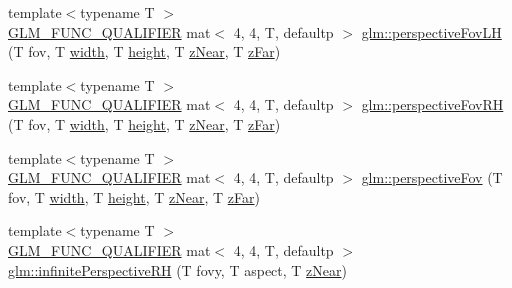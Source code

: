 \begin{DoxyCompactItemize}
\item 
{\footnotesize template$<$typename T $>$ }\\\mbox{\hyperlink{setup_8hpp_a33fdea6f91c5f834105f7415e2a64407}{G\+L\+M\+\_\+\+F\+U\+N\+C\+\_\+\+Q\+U\+A\+L\+I\+F\+I\+ER}} mat$<$ 4, 4, T, defaultp $>$ \mbox{\hyperlink{group__gtc__matrix__transform_ga6aebe16c164bd8e52554cbe0304ef4aa}{glm\+::perspective\+Fov\+LH}} (T fov, T \mbox{\hyperlink{_s_d_l__opengl_8h_a9a82cf3caff84cabc4598e2619faac17}{width}}, T \mbox{\hyperlink{_s_d_l__opengl_8h_aa352f2804b9902ac30769c00dde75d5f}{height}}, T \mbox{\hyperlink{_s_d_l__opengl__glext_8h_a12d99226e590bbaaf0be69169eeb4834}{z\+Near}}, T \mbox{\hyperlink{_s_d_l__opengl__glext_8h_a1052a8235df129542aea6da80fbec6a1}{z\+Far}})
\item 
{\footnotesize template$<$typename T $>$ }\\\mbox{\hyperlink{setup_8hpp_a33fdea6f91c5f834105f7415e2a64407}{G\+L\+M\+\_\+\+F\+U\+N\+C\+\_\+\+Q\+U\+A\+L\+I\+F\+I\+ER}} mat$<$ 4, 4, T, defaultp $>$ \mbox{\hyperlink{group__gtc__matrix__transform_gaf32bf563f28379c68554a44ee60c6a85}{glm\+::perspective\+Fov\+RH}} (T fov, T \mbox{\hyperlink{_s_d_l__opengl_8h_a9a82cf3caff84cabc4598e2619faac17}{width}}, T \mbox{\hyperlink{_s_d_l__opengl_8h_aa352f2804b9902ac30769c00dde75d5f}{height}}, T \mbox{\hyperlink{_s_d_l__opengl__glext_8h_a12d99226e590bbaaf0be69169eeb4834}{z\+Near}}, T \mbox{\hyperlink{_s_d_l__opengl__glext_8h_a1052a8235df129542aea6da80fbec6a1}{z\+Far}})
\item 
{\footnotesize template$<$typename T $>$ }\\\mbox{\hyperlink{setup_8hpp_a33fdea6f91c5f834105f7415e2a64407}{G\+L\+M\+\_\+\+F\+U\+N\+C\+\_\+\+Q\+U\+A\+L\+I\+F\+I\+ER}} mat$<$ 4, 4, T, defaultp $>$ \mbox{\hyperlink{group__gtc__matrix__transform_gaebd02240fd36e85ad754f02ddd9a560d}{glm\+::perspective\+Fov}} (T fov, T \mbox{\hyperlink{_s_d_l__opengl_8h_a9a82cf3caff84cabc4598e2619faac17}{width}}, T \mbox{\hyperlink{_s_d_l__opengl_8h_aa352f2804b9902ac30769c00dde75d5f}{height}}, T \mbox{\hyperlink{_s_d_l__opengl__glext_8h_a12d99226e590bbaaf0be69169eeb4834}{z\+Near}}, T \mbox{\hyperlink{_s_d_l__opengl__glext_8h_a1052a8235df129542aea6da80fbec6a1}{z\+Far}})
\item 
{\footnotesize template$<$typename T $>$ }\\\mbox{\hyperlink{setup_8hpp_a33fdea6f91c5f834105f7415e2a64407}{G\+L\+M\+\_\+\+F\+U\+N\+C\+\_\+\+Q\+U\+A\+L\+I\+F\+I\+ER}} mat$<$ 4, 4, T, defaultp $>$ \mbox{\hyperlink{group__gtc__matrix__transform_ga99672ffe5714ef478dab2437255fe7e1}{glm\+::infinite\+Perspective\+RH}} (T fovy, T aspect, T \mbox{\hyperlink{_s_d_l__opengl__glext_8h_a12d99226e590bbaaf0be69169eeb4834}{z\+Near}})

\end{DoxyCompactItemize}
